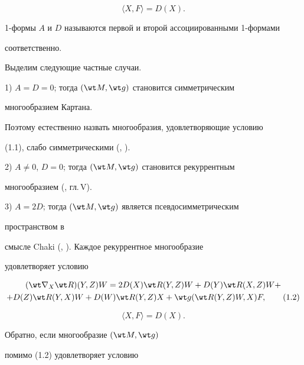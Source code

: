 $$


\langle X,F\rangle =D(X).


$$





1-формы $A$ и $D$ называются первой и второй ассоциированными 1-формами


соответственно.





Выделим следующие частные случаи.





1) $A=D=0$; тогда $(\wt M,\wt g)$ становится симметрическим


многообразием Картана.


Поэтому естественно назвать многообразия, удовлетворяющие условию


(1.1), слабо симметрическими (\cite{1}, \cite{12}).





2) $A\ne 0$, $D=0$; тогда $(\wt M,\wt g)$ становится рекуррентным


многообразием (\cite{11}, гл.\,V).





3) $A=2D$; тогда $(\wt M,\wt g)$ является псевдосимметрическим


пространством в


смысле Chaki (\cite{2}, \cite{3}). Каждое рекуррентное многообразие


удовлетворяет условию


\begin{multline}


(\wt\nabla_X\wt R)(Y,Z)W=2D(X)\wt R(Y,Z)W+D(Y)\wt R(X,Z)W+ \\


+D(Z)\wt R(Y,X)W+D(W)\wt R(Y,Z)X+\wt g(\wt R(Y,Z)W,X)


F,\tag{1.2}


\end{multline}


$$


\langle X,F\rangle=D(X).


$$





Обратно, если многообразие $(\wt M,\wt g)$


помимо (1.2) удовлетворяет условию


